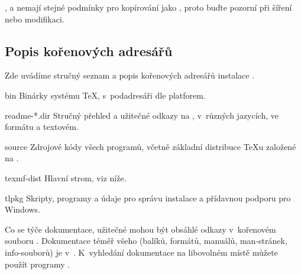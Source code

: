\documentclass[\classoptions,slovak,english,czech]{\classname}
\begin{document}
\CTAN{},  a 
nemají stejné podmínky pro kopírování jako \TL{}, 
proto buďte pozorní při šíření nebo modifikaci.


\subsection{Popis kořenových adresářů \protect\TL{}}
\label{sec:tld}

Zde uvádíme stručný seznam a popis kořenových adresářů instalace \TL{}. 

\begin{ttdescription}
\item[bin] Binárky systému \TeX{}, s~podadresáři dle platforem.
%
\item[readme-*.dir] Stručný přehled a užitečné odkazy 
na \TL{}, v~různých jazycích, ve formátu \HTML{} a textovém.
%
\item[source] Zdrojové kódy všech programů, včetně základní distribuce
   \TeX{}u založené na \Webc{}.
%
\item[texmf-dist] Hlavní strom, viz  níže.
%
\item[tlpkg] Skripty, programy a údaje pro správu instalace a  
přídavnou podporu pro Windows.
\end{ttdescription}

\smallskip

Co se týče dokumentace, užitečné mohou 
být obsáhlé odkazy v~kořenovém souboru .
Dokumentace téměř všeho (balíků, formátů, manuálů, man-stránek, info-souborů) 
je v~.
K~vyhledání dokumentace na libovolném místě můžete 
použít programy . %
\end{document}
